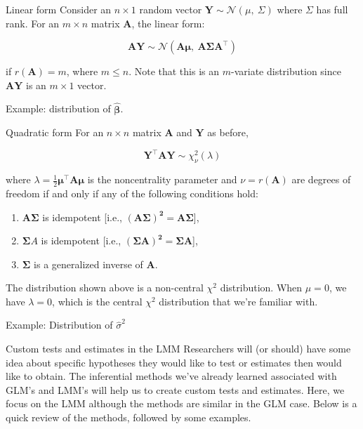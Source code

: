 \documentclass[
  9pt,
  ignorenonframetext,
]{beamer}
\providecommand{\tightlist}{%
  \setlength{\itemsep}{0pt}\setlength{\parskip}{0pt}}
\begin{document}
\begin{frame}{Linear form}
\protect\hypertarget{linear-form}{}
Consider an \(n \times 1\) random vector
\(\pmb Y \sim \mathcal N(\mu,\ \Sigma)\) where \(\Sigma\) has full rank.
For an \(m\times n\) matrix \(\pmb A\), the linear form:

\[
\pmb {AY} \sim \mathcal N (\pmb {A\mu},\ \pmb{A\Sigma A^{\top}})
\]

if \(r(\pmb A)=m\), where \(m \leq n\). Note that this is an
\(m\)-variate distribution since \(\pmb {AY}\) is an \(m \times 1\)
vector.

Example: distribution of \(\pmb {\hat \beta}\).
\end{frame}

\begin{frame}{Quadratic form}
\protect\hypertarget{quadratic-form}{}
For an \(n \times n\) matrix \(\pmb A\) and \(\pmb Y\) as before,

\[
\pmb {Y^{\top} AY } \sim \chi_\nu^2 (\lambda)
\]

where \(\lambda = \frac 1 2 \pmb {\mu^{\top} A \mu}\) is the
noncentrality parameter and \(\nu = r(\pmb A)\) are degrees of freedom
if and only if any of the following conditions hold:

\begin{enumerate}
\tightlist
\item
  \(\pmb {A \Sigma}\) is idempotent {[}i.e.,
  \(\pmb {(A \Sigma)^2 = A \Sigma}\){]},\\
\item
  \(\pmb \Sigma A\) is idempotent {[}i.e.,
  \(\pmb {(\Sigma A)^2 = \Sigma A}\){]},\\
\item
  \(\pmb \Sigma\) is a generalized inverse of \(\pmb A\).
\end{enumerate}

The distribution shown above is a non-central \(\chi^2\) distribution.
When \(\mu = 0\), we have \(\lambda = 0\), which is the central
\(\chi^2\) distribution that we're familiar with.

Example: Distribution of \(\hat {\sigma}^2\)
\end{frame}

\begin{frame}{Custom tests and estimates in the LMM}
\protect\hypertarget{custom-tests-and-estimates-in-the-lmm}{}
Researchers will (or should) have some idea about specific hypotheses
they would like to test or estimates then would like to obtain. The
inferential methods we've already learned associated with GLM's and
LMM's will help us to create custom tests and estimates. Here, we focus
on the LMM although the methods are similar in the GLM case. Below is a
quick review of the methods, followed by some examples.
\end{frame}
\end{document}
